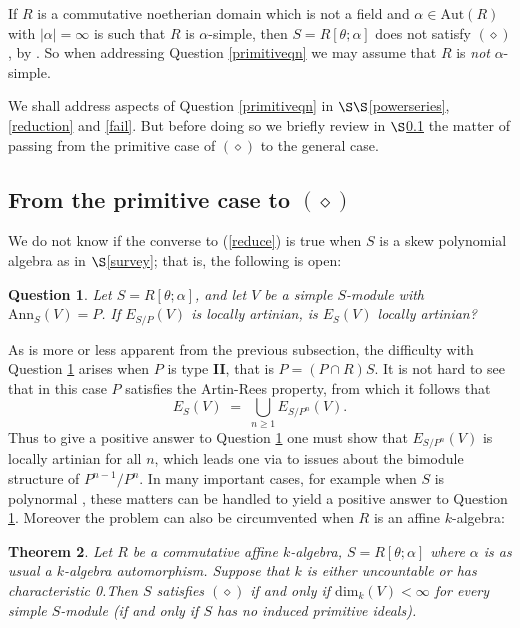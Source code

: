 \documentclass[a4paper, 11pt]{article}
\newtheorem{theorem}{Theorem}[section]
\newtheorem{question}[theorem]{Question}
\theoremstyle{definition}
\begin{document}
\noindent If $R$ is a commutative noetherian domain which is not a field and $\alpha \in \mathrm{Aut}(R)$ with $|\alpha| = \infty$ is such that $R$ is $\alpha$-simple, then $S = R[\theta;\alpha]$ does not satisfy $(\diamond)$, by \cite[Proposition 4.10]{BCM}. So when addressing Question \ref{primitiveqn} we may assume that $R$ is {\it not} $\alpha$-simple. 

We shall address aspects of Question \ref{primitiveqn} in $\S\S$\ref{powerseries}, \ref{reduction} and \ref{fail}. But before doing so we briefly review in $\S$\ref{general} the matter of passing from the primitive case of $(\diamond)$ to the general case.

\medskip

\subsection{From the primitive case to $(\diamond)$}\label{general}

We do not know if the converse to (\ref{reduce}) is true when $S$ is a skew polynomial algebra as in $\S$\ref{survey}; that is, the following is open:

\begin{question}\label{reverse} Let $S = R[\theta; \alpha]$, and let $V$ be a simple $S$-module with $\mathrm{Ann}_S(V) = P$. If $E_{S/P}(V)$ is locally artinian, is $E_S(V)$ locally artinian?
\end{question}

As is more or less apparent from the previous subsection, the difficulty with Question \ref{reverse} arises when $P$ is type {\bf II}, that is $P = (P \cap R)S$. It is not hard to see that in this case $P$ satisfies the Artin-Rees property, from which it follows that 
$$ E_S(V) \; = \; \bigcup_{n \geq 1} E_{S/P^n}(V). $$
Thus to give a positive answer to Question \ref{reverse} one must show that $E_{S/P^n}(V)$ is locally artinian for all $n$, which leads one via \cite[Lemma 1]{RZ} to issues about the bimodule structure of $P^{n-1}/P^n$. In many important cases, for example when $S$ is polynormal \cite[Corollary 3.5]{BCM}, these matters can be handled to yield a positive answer to Question \ref{reverse}. Moreover the problem can also be circumvented when $R$ is an affine $k$-algebra:

\begin{theorem}\label{affine}\cite[Theorem 6.1, Remark $(ii)$ of $\S$6]{BCM} Let $R$ be a commutative affine $k$-algebra, $S = R[\theta; \alpha]$ where $\alpha$ is as usual a $k$-algebra automorphism. Suppose that $k$ is either uncountable or has characteristic 0.Then $S$ satisfies $(\diamond)$ if and only if $\mathrm{dim}_k(V) < \infty$ for every simple $S$-module (if and only if $S$ has no induced primitive ideals). 
\end{theorem}
\end{document}
